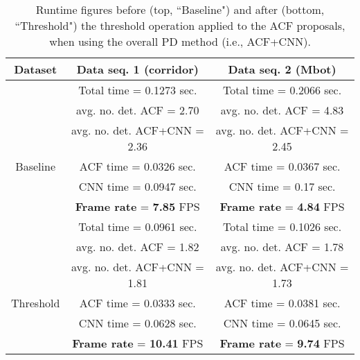 \documentclass[5p,time]{elsarticle}
\begin{document}
\newcommand{\scz}{\scriptsize}

\begin{table}
	\caption{Runtime figures before (top, ``Baseline") and after (bottom, ``Threshold") the threshold operation applied to the ACF proposals, when using the overall PD method (i.e., ACF+CNN).}
	\label{tab:running-times-2}
	\begin{center}
		\begin{tabular}{|c|c|c|}
			\hline{\bf  Dataset} & {\bf  Data seq. 1 (corridor)} & {\bf Data seq. 2 (Mbot)}   \\ \hline
			
			&              \scz Total time       =  0.1273 sec. &    \scz Total time  =  0.2066 sec. \\
			& 			 \scz avg. no. det. ACF = 2.70  		 &   \scz avg. no. det. ACF = 4.83  \\
			& 			 \scz avg. no. det. ACF+CNN = 2.36   	     &    \scz avg. no. det. ACF+CNN = 2.45  \\
			Baseline    &  \scz ACF time         =  0.0326 sec.       &    \scz ACF time    =  0.0367 sec.       \\
			&              \scz CNN time         =  0.0947 sec.       &    \scz CNN  time   =  0.17   sec.       \\
			&              \scz{\bf Frame rate} =   {\bf 7.85} FPS   &    \scz{\bf Frame rate} =   {\bf 4.84}  FPS \\
			\hline
			
			&              \scz Total time  =  0.0961 sec.            &    \scz Total time  =  0.1026 sec.       \\
			& 			 \scz avg. no. det. ACF = 1.82   			   &  \scz   avg. no. det. ACF = 1.78 \\
			& 			 \scz avg. no. det. ACF+CNN = 1.81    		   &  \scz   avg. no. det. ACF+CNN = 1.73  \\
			Threshold   &  \scz ACF time    =  0.0333 sec.            &    \scz ACF time    =  0.0381 sec.       \\
			&              \scz CNN time    =  0.0628 sec.            &    \scz CNN  time   =  0.0645 sec.       \\
			&              \scz{\bf Frame rate} =   {\bf 10.41} FPS  &    \scz{\bf Frame rate} =   {\bf 9.74} FPS  \\
			\hline
		\end{tabular}
	\end{center}
\end{table}
\end{document}
